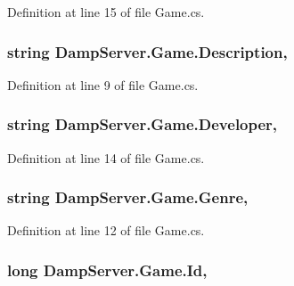 Definition at line 15 of file Game.\-cs.

\hypertarget{class_damp_server_1_1_game_afe5ba467625ea46f365aca09bad68947}{
\subsubsection[{Description}]{\setlength{\rightskip}{0pt plus 5cm}string Damp\-Server.\-Game.\-Description\hspace{0.3cm}{\ttfamily [get]}, {\ttfamily [set]}}}\label{class_damp_server_1_1_game_afe5ba467625ea46f365aca09bad68947}


Definition at line 9 of file Game.\-cs.

\hypertarget{class_damp_server_1_1_game_ace54b747f70c31b6be58801d12c968ea}{
\subsubsection[{Developer}]{\setlength{\rightskip}{0pt plus 5cm}string Damp\-Server.\-Game.\-Developer\hspace{0.3cm}{\ttfamily [get]}, {\ttfamily [set]}}}\label{class_damp_server_1_1_game_ace54b747f70c31b6be58801d12c968ea}


Definition at line 14 of file Game.\-cs.

\hypertarget{class_damp_server_1_1_game_a0cad62e6865f37362b15cf6e7099d760}{
\subsubsection[{Genre}]{\setlength{\rightskip}{0pt plus 5cm}string Damp\-Server.\-Game.\-Genre\hspace{0.3cm}{\ttfamily [get]}, {\ttfamily [set]}}}\label{class_damp_server_1_1_game_a0cad62e6865f37362b15cf6e7099d760}


Definition at line 12 of file Game.\-cs.

\hypertarget{class_damp_server_1_1_game_a26a7f270fc8e2d00bc6200dadcf73477}{
\subsubsection[{Id}]{\setlength{\rightskip}{0pt plus 5cm}long Damp\-Server.\-Game.\-Id\hspace{0.3cm}{\ttfamily [get]}, {\ttfamily [set]}}}\label{class_damp_server_1_1_game_a26a7f270fc8e2d00bc6200dadcf73477}


